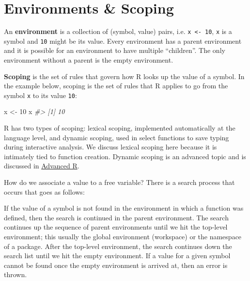 \documentclass[]{book}
\newenvironment{Shaded}{\begin{snugshade}}{\end{snugshade}}
\newcommand{\DecValTok}[1]{\textcolor[rgb]{0.00,0.00,0.81}{#1}}
\newcommand{\StringTok}[1]{\textcolor[rgb]{0.31,0.60,0.02}{#1}}
\newcommand{\CommentTok}[1]{\textcolor[rgb]{0.56,0.35,0.01}{\textit{#1}}}
\newcommand{\NormalTok}[1]{#1}
\begin{document}
\section{Environments \& Scoping}\label{environments-scoping}

An \textbf{environment} is a collection of (symbol, value) pairs, i.e.
\texttt{x\ \textless{}-\ 10}, \texttt{x} is a symbol and \texttt{10}
might be its value. Every environment has a parent environment and it is
possible for an environment to have multiple ``children''. The only
environment without a parent is the empty environment.

\textbf{Scoping} is the set of rules that govern how R looks up the
value of a symbol. In the example below, scoping is the set of rules
that R applies to go from the symbol \texttt{x} to its value
\texttt{10}:

\begin{Shaded}
\begin{Highlighting}[]
\NormalTok{x <-}\StringTok{ }\DecValTok{10}
\NormalTok{x}
\CommentTok{#> [1] 10}
\end{Highlighting}
\end{Shaded}

R has two types of scoping: lexical scoping, implemented automatically
at the language level, and dynamic scoping, used in select functions to
save typing during interactive analysis. We discuss lexical scoping here
because it is intimately tied to function creation. Dynamic scoping is
an advanced topic and is discussed in
\href{http://adv-r.had.co.nz}{Advanced R}.

How do we associate a value to a free variable? There is a search
process that occurs that goes as follows:

If the value of a symbol is not found in the environment in which a
function was defined, then the search is continued in the parent
environment. The search continues up the sequence of parent environments
until we hit the top-level environment; this usually the global
environment (workspace) or the namespace of a package. After the
top-level environment, the search continues down the search list until
we hit the empty environment. If a value for a given symbol cannot be
found once the empty environment is arrived at, then an error is thrown.
\end{document}
